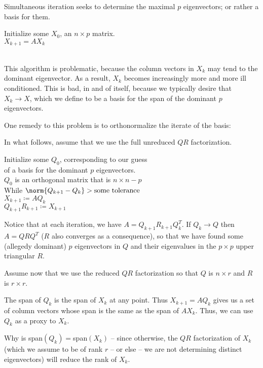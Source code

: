 \documentclass[../main.tex]{subfiles}
\begin{document}
\begin{definition}
    Simultaneous iteration seeks to determine the maximal $p$ eigenvectors; or rather a basis for them.
    \begin{algo}
        Initialize some $X_0$, an $n \times p$ matrix. \\
        $X_{k+1} = AX_{k}$ \\
         \\
    \end{algo}
\end{definition}

\begin{remark}
    This algorithm is problematic, because the column vectors in $X_k$ may tend to the dominant eigenvector. As a result, $X_k$ becomes increasingly more and more ill conditioned. This is bad, in and of itself, because we typically desire that $X_k \to X$, which we define to be a basis for the span of the dominant $p$ eigenvectors.
\end{remark}

\begin{definition}
    One remedy to this problem is to orthonormalize the iterate of the basis:

    In what follows, assume that we use the full unreduced $QR$ factorization.

    \begin{algo}
        Initialize some $Q_0$, corresponding to our guess \\
        of a basis for the dominant $p$ eigenvectors.\\
        $Q_0$ is an orthogonal matrix that is $n \times n-p$ \\
        While $\norm{Q_{k+1} - Q_{k}} > \text{some tolerance}$ \+\\
        $X_{k+1} \coloneq AQ_{k}$ \\
        $Q_{k+1}R_{k+1} \coloneq X_{k+1}$ \\
    \end{algo}

    Notice that at each iteration, we have $A = Q_{k+1}R_{k+1}Q_{k}^T$. If $Q_k \to Q$ then $A = QRQ^{T}$ ($R$ also converges as a consequence), so that we have found some (allegedy dominant) $p$ eigenvectors in $Q$ and their eigenvalues in the $p \times p$ upper triangular $R$.
\end{definition}

\begin{remark}
    Assume now that we use the reduced $QR$ factorization so that $Q$ is $n \times r$ and $R$ is $r \times r$.

    The span of $Q_k$ is the span of $X_k$ at any point. Thus $X_{k+1} = A Q_{k}$ gives us a set of column vectors whose span is the same as the span of $AX_{k}$. Thus, we can use $Q_k$ as a proxy to $X_k$.

    Why is span$(Q_k) = $span$(X_k)$ -- since otherwise, the $QR$ factorization of $X_k$ (which we assume to be of rank $r$ -- or else -- we are not determining distinct eigenvectors) will reduce the rank of $X_k$.
\end{remark}
\end{document}
